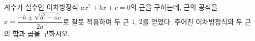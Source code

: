 계수가 실수인 이차방정식 $ax^2+bx+c=0$의 근을 구하는데, 근의 공식을 $x=\dfrac{-b\pm\sqrt{b^2-ac}}{2a}$로 잘못 적용하여 두 근 $1$, $2$를 얻었다. 주어진 이차방정식의 두 근의 합과 곱을 구하시오.
